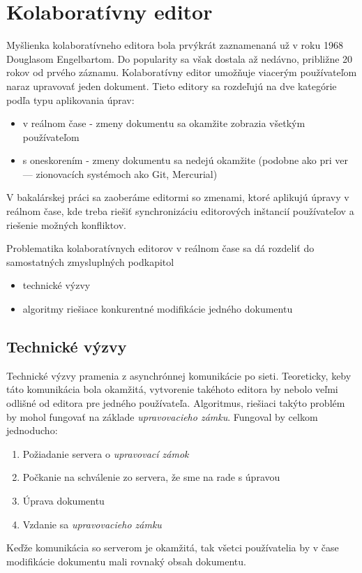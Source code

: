 \chapter{Kolaboratívny editor}

\label{kap:zdialtelnost} %

Myšlienka kolaboratívneho editora bola prvýkrát zaznamenaná už v roku 1968 Douglasom Engelbartom. 
Do popularity sa však dostala až nedávno, približne 20 rokov od prvého záznamu.
Kolaboratívny editor umožňuje viacerým používateľom naraz upravovať jeden dokument.
Tieto editory sa rozdeľujú na dve kategórie podľa typu aplikovania úprav:
\begin{itemize}
  \item v reálnom čase - zmeny dokumentu sa okamžite zobrazia všetkým používateľom
  \item s oneskorením - zmeny dokumentu sa nedejú okamžite (podobne ako pri ver --- zionovacích
  systémoch ako Git, Mercurial)
\end{itemize}
V bakalárskej práci sa zaoberáme editormi so zmenami, ktoré aplikujú úpravy v reálnom čase, kde treba
riešiť synchronizáciu editorových inštancií používateľov a riešenie možných konfliktov.

Problematika kolaboratívnych editorov v reálnom čase sa dá rozdeliť do samostatných zmysluplných 
podkapitol
\begin{itemize}
\item  technické výzvy
\item  algoritmy riešiace konkurentné modifikácie jedného dokumentu
\end{itemize}

\section{Technické výzvy}
Technické výzvy pramenia z asynchrónnej komunikácie po sieti. Teoreticky, keby táto 
komunikácia bola okamžitá, vytvorenie takéhoto editora by nebolo veľmi odlišné od
editora pre jedného používateľa. Algoritmus\label{algo:nesubezne_editovanie}, 
riešiaci takýto problém by mohol fungovať na základe 
\textit{upravovacieho zámku}. Fungoval by celkom jednoducho:
\begin{enumerate}
  \item Požiadanie servera o \textit{upravovací zámok}
  \item Počkanie na schválenie zo servera, že sme na rade s úpravou
  \item Úprava dokumentu
  \item Vzdanie sa \textit{upravovacieho zámku}
\end{enumerate}
Keďže komunikácia so serverom je okamžitá, tak všetci používatelia by v čase modifikácie
dokumentu mali rovnaký obsah dokumentu. 

